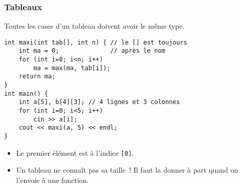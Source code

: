 \documentclass[12pt]{beamer}
\begin{document}
\begin{frame}[fragile]
\frametitle{Tableaux}
Toutes les cases d'un tableau doivent avoir le même type.
\begin{lstlisting}
int maxi(int tab[], int n) { // le [] est toujours
    int ma = 0;              // après le nom
    for (int i=0; i<n; i++)
        ma = max(ma, tab[i]);
    return ma;
}
int main() {
    int a[5], b[4][3]; // 4 lignes et 3 colonnes
    for (int i=0; i<5; i++)
        cin >> a[i];
    cout << maxi(a, 5) << endl;
}
\end{lstlisting}
\begin{itemize}
\item Le premier élément est à l'indice \lstinline|[0]|.
\item Un tableau ne connaît pas sa taille ! Il faut la donner à part quand on l'envoie à une fonction.
\end{itemize}
\end{frame}
\end{document}
